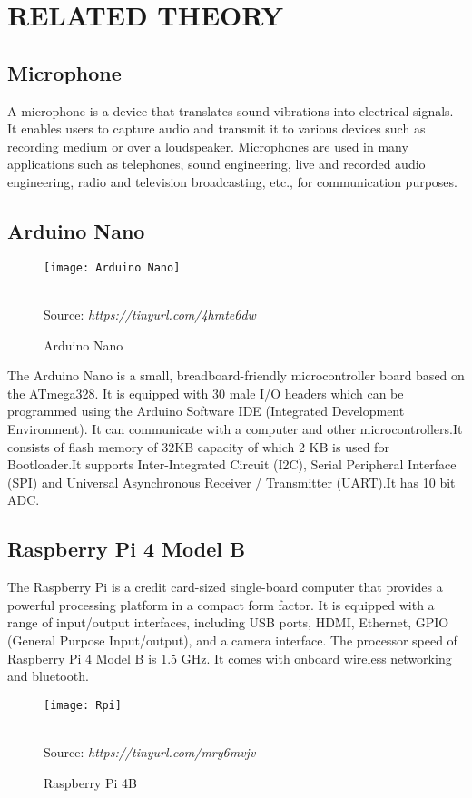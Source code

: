 
\chapter{RELATED THEORY}
\section{Microphone}
A microphone is a device that translates sound vibrations into electrical signals. It enables users to capture audio and transmit it to various devices such as recording medium or over a loudspeaker. Microphones are used in many applications such as telephones, sound engineering, live and recorded audio engineering, radio and television broadcasting, etc., for communication purposes.	 
\section{Arduino Nano}
\begin{figure}[h]
\centering  \texttt{[image: Arduino Nano]}
\caption{Arduino Nano}\\ 
Source: \textit{https://tinyurl.com/4hmte6dw}
\label{fig:ArduinoNano}
\end{figure}
The Arduino Nano is a small, breadboard-friendly microcontroller board based on the ATmega328. It is equipped with 30 male I/O headers which can be programmed using the Arduino Software IDE (Integrated Development Environment). It can communicate with a computer and other microcontrollers.It consists of flash memory  of 32KB capacity of which 2 KB is used for Bootloader.It supports Inter-Integrated Circuit (I2C), Serial Peripheral Interface (SPI) and Universal Asynchronous Receiver / Transmitter (UART).It has 10 bit ADC. 


\section{Raspberry Pi 4 Model B}
The Raspberry Pi is a credit card-sized single-board computer that provides a powerful processing platform in a compact form factor. It is equipped with a range of input/output interfaces, including USB ports, HDMI, Ethernet, GPIO (General Purpose Input/output), and a camera interface. The processor speed of Raspberry Pi 4 Model B is 1.5 GHz. It comes with onboard wireless networking and bluetooth.
\begin{figure}[h]
\centering  \texttt{[image: Rpi]}
\caption{Raspberry Pi 4B}\\ 
Source: \textit{https://tinyurl.com/mry6mvjv}
\label{fig:Raspberyypi}
\end{figure}

